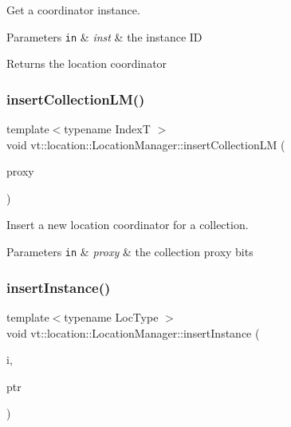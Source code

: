 Get a coordinator instance. 


\begin{DoxyParams}[1]{Parameters}
\mbox{\tt in}  & {\em inst} & the instance ID\\
\hline
\end{DoxyParams}
\begin{DoxyReturn}{Returns}
the location coordinator 
\end{DoxyReturn}
\mbox{\label{structvt_1_1location_1_1_location_manager_a07688f13ca31cb8d3081b70481a228b1}} 
\subsubsection{\texorpdfstring{insert\+Collection\+L\+M()}{insertCollectionLM()}}
{\footnotesize\ttfamily template$<$typename IndexT $>$ \\
void vt\+::location\+::\+Location\+Manager\+::insert\+Collection\+LM (\begin{DoxyParamCaption}\item[{\hyperlink{namespacevt_a1b417dd5d684f045bb58a0ede70045ac}{Virtual\+Proxy\+Type} const \&}]{proxy }\end{DoxyParamCaption})}



Insert a new location coordinator for a collection. 


\begin{DoxyParams}[1]{Parameters}
\mbox{\tt in}  & {\em proxy} & the collection proxy bits \\
\hline
\end{DoxyParams}
\mbox{\label{structvt_1_1location_1_1_location_manager_a61767ba0d9bd9029686c136cdb8eaece}} 
\subsubsection{\texorpdfstring{insert\+Instance()}{insertInstance()}}
{\footnotesize\ttfamily template$<$typename Loc\+Type $>$ \\
void vt\+::location\+::\+Location\+Manager\+::insert\+Instance (\begin{DoxyParamCaption}\item[{\hyperlink{namespacevt_1_1location_a4db6456e8024af2d23fc5ae560fef866}{Loc\+Inst\+Type} const}]{i,  }\item[{Loc\+Type $\ast$}]{ptr }\end{DoxyParamCaption})\hspace{0.3cm}{\ttfamily [static]}}



